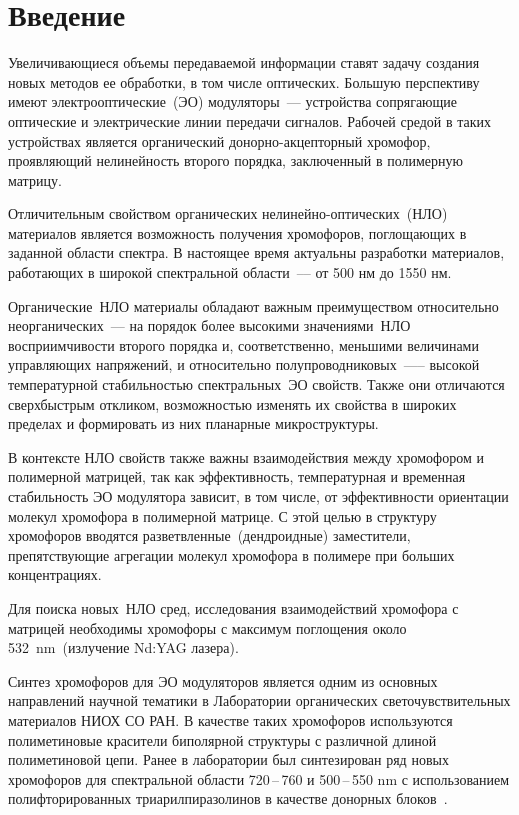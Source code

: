 \section{Введение}
Увеличивающиеся объемы передаваемой информации ставят задачу создания новых методов ее обработки, в том числе оптических. Большую перспективу имеют электрооптические~(ЭО) модуляторы~--- устройства сопрягающие оптические и электрические линии передачи сигналов. Рабочей средой в таких устройствах является органический донорно-акцепторный хромофор, проявляющий нелинейность второго порядка, заключенный в полимерную матрицу.

Отличительным свойством органических нелинейно-оптических~(НЛО) материалов является возможность получения хромофоров, поглощающих в заданной области спектра. В настоящее время актуальны разработки материалов, работающих в широкой спектральной области~–-- от 500 нм до 1550 нм.

Органические~НЛО материалы обладают важным преимуществом относительно неорганических~--- на порядок более высокими значениями~НЛО восприимчивости второго порядка и, соответственно, меньшими величинами управляющих напряжений, и относительно полупроводниковых~—-- высокой температурной стабильностью спектральных~ЭО свойств. Также они отличаются сверхбыстрым откликом, возможностью изменять их свойства в широких пределах и формировать из них планарные микроструктуры.

В контексте НЛО свойств также важны взаимодействия между хромофором и полимерной матрицей, так как эффективность, температурная и временная стабильность  ЭО модулятора зависит, в том числе, от эффективности ориентации молекул хромофора в полимерной матрице. С этой целью в структуру хромофоров вводятся разветвленные~(дендроидные) заместители, препятствующие агрегации молекул хромофора в полимере при больших концентрациях. 

Для поиска новых~НЛО сред, исследования взаимодействий хромофора с матрицей необходимы хромофоры с максимум поглощения около \SI{532}{\nano\metre}~(излучение Nd:YAG лазера).

Синтез хромофоров для ЭО модуляторов является одним из основных направлений научной тематики в Лаборатории органических светочувствительных материалов НИОХ СО РАН. В качестве таких хромофоров используются полиметиновые красители биполярной структуры с различной длиной полиметиновой цепи. Ранее в лаборатории был синтезирован ряд новых хромофоров для спектральной области 720\,--\,760 и 500\,--\,550 \si{\nano\metre} с использованием полифторированных триарилпиразолинов в качестве донорных блоков~\cite{2019, 2019b}.

